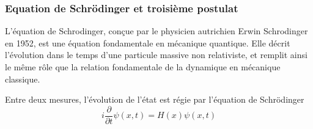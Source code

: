 \subsubsection{Equation de Schrödinger et troisième postulat}
L'équation de Schrodinger, conçue par le physicien autrichien Erwin Schrodinger en 1952, est une équation fondamentale en mécanique quantique. Elle décrit l'évolution dans le temps d’une particule massive non relativiste, et remplit ainsi le même rôle que la relation fondamentale de la dynamique en mécanique classique.
\begin{Post}
	Entre deux mesures, l’évolution de l’état est régie par l’équation de Schrödinger
	\begin{equation}
	i \frac{\partial }{\partial t} \psi (x,t) = H(x)\psi (x,t)
	\end{equation}
\end{Post}